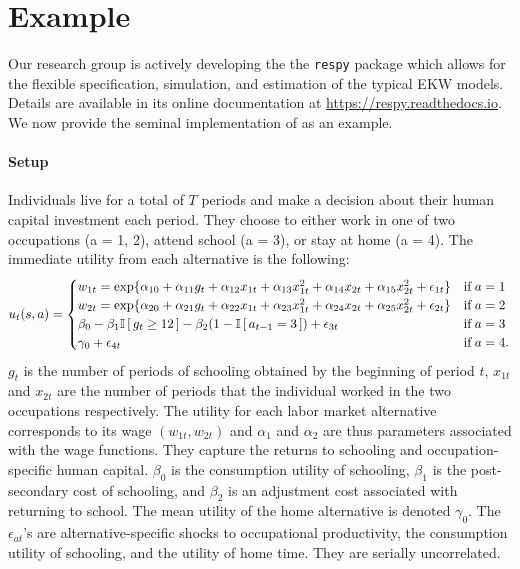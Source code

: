 \section{Example}\label{Example}
Our research group is actively developing the the \verb+respy+ package which allows for the flexible specification, simulation, and estimation of the typical EKW models. Details are available in its online documentation at \url{https://respy.readthedocs.io}. We now provide the seminal implementation of \citet{Keane.1994} as an example.

\paragraph{Setup} Individuals live for a total of $T$ periods and make a decision about their human capital investment each period. They choose to either work in one of two occupations (a = 1, 2), attend school (a = 3), or stay at home (a = 4). The immediate utility from each alternative is the following:
%
\begin{align*}
u_t(s, a) = \begin{cases} w_{1t} =
\exp\{\alpha_{10} + \alpha_{11}g_t + \alpha_{12}x_{1t} + \alpha_{13}x^2_{1t} + \alpha_{14}x_{2t} + \alpha_{15}x^2_{2t} + \epsilon_{1t}\} & \text{if}\; a = 1 \\
w_{2t} = \exp\{\alpha_{20} + \alpha_{21}g_t + \alpha_{22}x_{1t} + \alpha_{23}x^2_{1t} + \alpha_{24}x_{2t} + \alpha_{25}x^2_{2t} + \epsilon_{2t}\}& \text{if}\; a = 2 \\
\beta_0 - \beta_1 \mathbb{I}\,[\,g_t \geq 12\,] - \beta_2(1 - \mathbb{I}\,[\,a_{t - 1} = 3\,]) + \epsilon_{3t}& \text{if}\; a = 3 \\
\gamma_0 + \epsilon_{4t}& \text{if}\; a = 4. \\
\end{cases}
\end{align*}
%
$g_t$ is the number of periods of schooling obtained by the beginning of period $t$, $x_{1t}$ and $x_{2t}$ are the number of periods that the individual worked in the two occupations respectively. The utility for each labor market alternative corresponds to its wage $(w_{1t}, w_{2t})$ and $\alpha_{1}$ and $\alpha_{2}$ are thus parameters associated with the wage functions. They capture the returns to schooling and occupation-specific human capital. $\beta_0$ is the consumption utility of schooling, $\beta_1$ is the post-secondary cost of schooling, and $\beta_2$ is an adjustment cost associated with returning to school. The mean utility of the home alternative is denoted $\gamma_0$. The $\epsilon_{at}$'s are alternative-specific shocks to occupational productivity, the consumption utility of schooling, and the utility of home time. They are serially uncorrelated.\\

